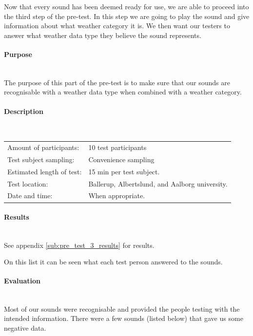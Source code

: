 Now that every sound has been deemed ready for use, we are able to proceed into the third step of the pre-test. 
In this step we are going to play the sound and give information about what weather category it is. 
We then want our testers to answer what weather data type they believe the sound represents.  

\paragraph{Purpose} %
\label{par:pre_test_3_purpose}
\hspace{0pt} \\
The purpose of this part of the pre-test is to make sure that our sounds are recognisable with a weather data type when combined with a weather category.

\paragraph{Description} %
\label{par:pre_test_3_description}
\hspace{0pt} \\
\begin{tabular}{l l}
Amount of participants: & 10 test participants \\
Test subject sampling: & Convenience sampling \\
Estimated length of test: & 15 min per test subject. \\
Test location: & Ballerup, Albertslund, and Aalborg university. \\
Date and time: & When appropriate.
\end{tabular}

\paragraph{Results} %
\label{par:pre_test_3_results}
\hspace{0pt} \\
See appendix \ref{sub:pre_test_3_results} for results.

On this list it can be seen what each test person answered to the sounds.

\paragraph{Evaluation} %
\label{par:pre_test_3_evaluation}
\hspace{0pt} \\
Most of our sounds were recognisable and provided the people testing with the intended information. \newline
There were a few sounds (listed below) that gave us some negative data.

